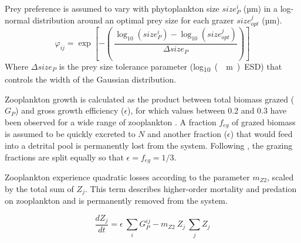 \documentclass[gmd, manuscript]{copernicus}
\begin{document}
Prey preference is assumed to vary with phytoplankton size $size_{P}^i$ (\unit{µm}) in a log-normal distribution around an optimal prey size for each grazer $size_{opt}^j$ (\unit{µm}).
\begin{equation}
    \varphi_{ij} = \exp \left[ -\left( \ \frac{ \log_{10}(size_P^i) - \log_{10}(size_{opt}^j) }{ \Delta size_{P} } \right) \right]
\end{equation}
Where $\Delta size_{P}$ is the prey size tolerance parameter (\unit{log_{10}(\mu m) ESD}) that controls the width of the Gaussian distribution.

Zooplankton growth is calculated as the product between total biomass grazed ($G_P$) and gross growth efficiency ($\epsilon$), for which values between 0.2 and 0.3 have been observed for a wide range of zooplankton \citep{Straile1997GrossGroup}. A fraction $f_{eg}$ of grazed biomass is assumed to be quickly excreted to $N$ and another fraction ($\epsilon$) that would feed into a detrital pool is permanently lost from the system. Following \citet{Banas2011b}, the grazing fractions are split equally so that $\epsilon = f_{eg} = 1/3$.

Zooplankton experience quadratic losses according to the parameter $m_{Z2}$, scaled by the total sum of $Z_j$. This term describes higher-order mortality and predation on zooplankton and is permanently removed from the system.

\begin{equation}
    \label{Eq:BanasZoo}
    \frac{d Z_j}{d t} =
    \epsilon \ \sum_{i} G_P^{ij} %
    - m_{Z2} \ Z_j \ \sum_{j} Z_j  %
\end{equation}
\end{document}

